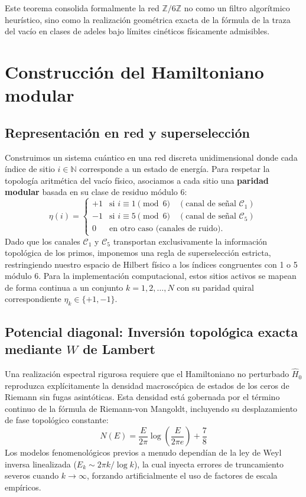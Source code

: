 \documentclass[aps,prl,preprint,superscriptaddress,floatfix]{revtex4-2}
\newcommand{\Zmod}{\mathbb{Z}/6\mathbb{Z}}
\begin{document}
Este teorema consolida formalmente la red $\Zmod$ no como un filtro algorítmico heurístico, sino como la realización geométrica exacta de la fórmula de la traza del vacío en clases de adeles bajo límites cinéticos físicamente admisibles.

\section{Construcción del Hamiltoniano modular}

\subsection{Representación en red y superselección}

Construimos un sistema cuántico en una red discreta unidimensional donde cada índice de sitio $i \in \mathbb{N}$ corresponde a un estado de energía. Para respetar la topología aritmética del vacío físico, asociamos a cada sitio una \textbf{paridad modular} basada en su clase de residuo módulo 6:
\begin{equation}
\eta(i) = \begin{cases}
+1 & \text{si } i \equiv 1 \pmod 6 \quad (\text{canal de señal } \mathcal{C}_1)\\
-1 & \text{si } i \equiv 5 \pmod 6 \quad (\text{canal de señal } \mathcal{C}_5)\\
0 & \text{en otro caso (canales de ruido)}.
\end{cases}
\end{equation}
Dado que los canales $\mathcal{C}_1$ y $\mathcal{C}_5$ transportan exclusivamente la información topológica de los primos, imponemos una regla de superselección estricta, restringiendo nuestro espacio de Hilbert físico a los índices congruentes con 1 o 5 módulo 6. Para la implementación computacional, estos sitios activos se mapean de forma continua a un conjunto $k = 1,2,\dots,N$ con su paridad quiral correspondiente $\eta_k \in \{+1,-1\}$.

\subsection{Potencial diagonal: Inversión topológica exacta mediante \texorpdfstring{$W$}{W} de Lambert}

Una realización espectral rigurosa requiere que el Hamiltoniano no perturbado $\hat{H}_0$ reproduzca explícitamente la densidad macroscópica de estados de los ceros de Riemann sin fugas asintóticas. Esta densidad está gobernada por el término continuo de la fórmula de Riemann-von Mangoldt, incluyendo su desplazamiento de fase topológico constante:
\begin{equation}
N(E) = \frac{E}{2\pi} \log\left(\frac{E}{2\pi e}\right) + \frac{7}{8}
\end{equation}
Los modelos fenomenológicos previos a menudo dependían de la ley de Weyl inversa linealizada ($E_k \sim 2\pi k / \log k$), la cual inyecta errores de truncamiento severos cuando $k \to \infty$, forzando artificialmente el uso de factores de escala empíricos. 
\end{document}
